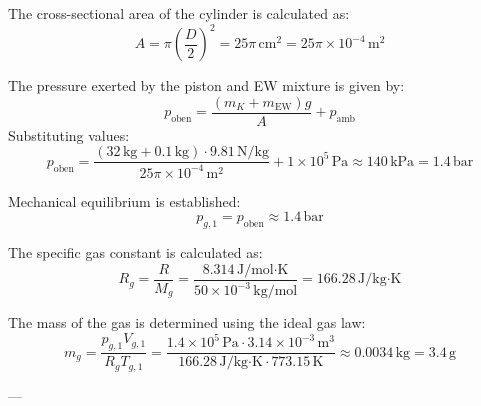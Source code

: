 The cross-sectional area of the cylinder is calculated as:  
\[
A = \pi \left( \frac{D}{2} \right)^2 = 25 \pi \, \text{cm}^2 = 25 \pi \times 10^{-4} \, \text{m}^2
\]  

The pressure exerted by the piston and EW mixture is given by:  
\[
p_{\text{oben}} = \frac{(m_K + m_{\text{EW}}) g}{A} + p_{\text{amb}}
\]  
Substituting values:  
\[
p_{\text{oben}} = \frac{(32 \, \text{kg} + 0.1 \, \text{kg}) \cdot 9.81 \, \text{N/kg}}{25 \pi \times 10^{-4} \, \text{m}^2} + 1 \times 10^5 \, \text{Pa} \approx 140 \, \text{kPa} = 1.4 \, \text{bar}
\]  

Mechanical equilibrium is established:  
\[
p_{g,1} = p_{\text{oben}} \approx 1.4 \, \text{bar}
\]  

The specific gas constant is calculated as:  
\[
R_g = \frac{R}{M_g} = \frac{8.314 \, \text{J/mol·K}}{50 \times 10^{-3} \, \text{kg/mol}} = 166.28 \, \text{J/kg·K}
\]  

The mass of the gas is determined using the ideal gas law:  
\[
m_g = \frac{p_{g,1} V_{g,1}}{R_g T_{g,1}} = \frac{1.4 \times 10^5 \, \text{Pa} \cdot 3.14 \times 10^{-3} \, \text{m}^3}{166.28 \, \text{J/kg·K} \cdot 773.15 \, \text{K}} \approx 0.0034 \, \text{kg} = 3.4 \, \text{g}
\]  

---
